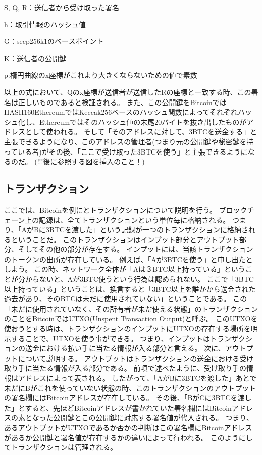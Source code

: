 \begin{list}{}{}
\item S, Q, R：送信者から受け取った署名
\item h：取引情報のハッシュ値
\item G：secp256k1のベースポイント
\item K：送信者の公開鍵
\item p:楕円曲線のx座標がこれより大きくならないための値で素数
\end{list}

以上の式において、Qのx座標が送信者が送信したRの座標と一致する時、この署名は正しいものであると検証される。
また、この公開鍵をBitcoinではHASH160EthereumではKeccak256ベースのハッシュ関数によってそれぞれハッシュ化し、Ethereumではそのハッシュ値の末尾20バイトを抜き出したものがアドレスとして使われる。
そして「そのアドレスに対して、3BTCを送金する」と主張できるようになり、このアドレスの管理者(つまり元の公開鍵や秘密鍵を持っている者)がその後、「ここで受け取った3BTCを使う」と主張できるようになるのだ。
(!!!後に参照する図を挿入のこと！)

\subsection{トランザクション}
ここでは、Bitcoinを例にとトランザクションについて説明を行う。
ブロックチェーン上の記録は、全てトランザクションという単位毎に格納される。
つまり、「AがBに3BTCを渡した」という記録が一つのトランザクションに格納されるということだ。
このトランザクションはインプット部分とアウトプット部分、そしてその他の部分が存在する。
インプットには、当該トランザクションのトークンの出所が存在している。
例えば、「Aが3BTCを使う」と申し出たとしよう。
この時、ネットワーク全体が「Aは３BTC以上持っている」ということが分からないと、Aが3BTC使うという行為は認められない。
ここで「3BTC以上持っている」ということは、換言すると「3BTC以上を誰かから送金された過去があり、そのBTCは未だに使用されていない」ということである。
この「未だに使用されていなく、その所有者が未だ使える状態」のトランザクションのことをBitcoinではUTXO(Unspent Transaction Output)と呼ぶ。
このUTXOを使おうとする時は、トランザクションのインプットにUTXOの存在する場所を明示することで、UTXOを使う事ができる。
つまり、インプットはトランザクションの送金における払い手に当たる情報が入る部分と言える。
次に、アウトプットについて説明する。
アウトプットはトランザクションの送金における受け取り手に当たる情報が入る部分である。
前項で述べたように、受け取り手の情報はアドレスによって表される。
したがって、「AがBに3BTCを渡した」あとで未だにBがこれを使っていない状態の時、このトランザクションのアウトプットの署名欄にはBitcoinアドレスが存在している。
その後、「BがCに3BTCを渡した」とすると、先ほどBitcoinアドレスが書かれていた署名欄にはBitcoinアドレスの素となった公開鍵とこの公開鍵に対応する署名値が代入される。
つまり、あるアウトプットがUTXOであるか否かの判断はこの署名欄にBitcoinアドレスがあるか公開鍵と署名値が存在するかの違いによって行われる。
このようにしてトランザクションは管理される。

